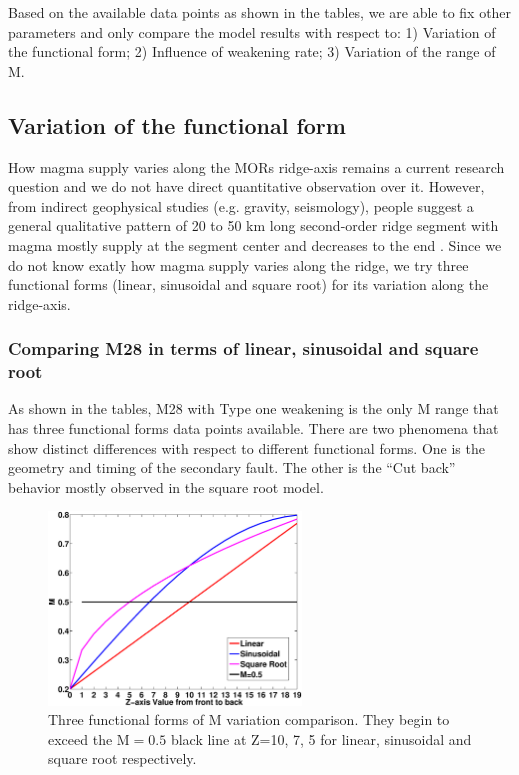Based on the available data points as shown in the tables, we are able to fix other parameters and only compare the model results with respect to: 1) Variation of the functional form; 2) Influence of weakening rate; 3) Variation of the range of M. 

\subsection{Variation of the functional form}
How magma supply varies along the MORs ridge-axis remains a current research question and we do not have direct quantitative observation over it. However, from indirect geophysical studies (e.g. gravity, seismology), people suggest a general qualitative pattern of 20 to 50 km long second-order ridge segment with magma mostly supply at the segment center and decreases to the end \citep{Carbotte2015}. Since we do not know exatly how magma supply varies along the ridge, we try three functional forms (linear, sinusoidal and square root) for its variation along the ridge-axis.

\subsubsection{Comparing M28 in terms of linear, sinusoidal and square root}
As shown in the tables, M28 with Type one weakening is the only M range that has three functional forms data points available. There are two phenomena that show distinct differences with respect to different functional forms. One is the geometry and timing of the secondary fault. The other is the ``Cut back'' behavior mostly observed in the square root model.

\begin{figure}[h]
  \centering
    \includegraphics[width=0.6\textwidth]{fig_Results3_1.eps}
  \caption{Three functional forms of M variation comparison. They begin to exceed the M$=0.5$ black line at Z=10, 7, 5 for linear, sinusoidal and square root respectively.}
 \label{fig_Results3_1}
\end{figure}   


